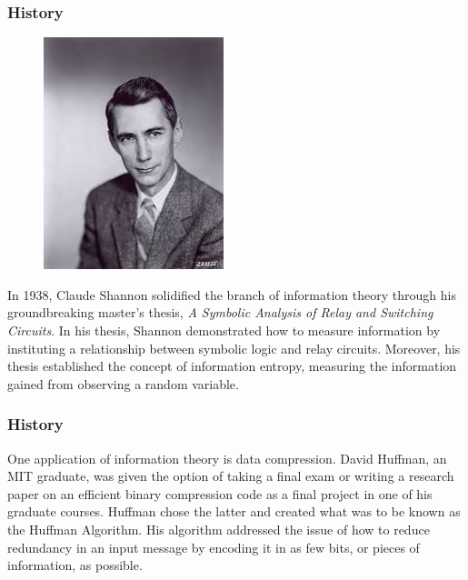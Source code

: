 \documentclass{beamer}
\theoremstyle{definition}
\begin{document}
\begin{frame}

\frametitle{History}

\begin{figure}

\centering
\includegraphics[scale=0.4]{Claude_Shannon}

\end{figure}

In 1938, Claude Shannon solidified the branch of information theory through his groundbreaking master's thesis, \textit{A Symbolic Analysis of Relay and Switching Circuits}.  In his thesis, Shannon demonstrated how to measure information by instituting a relationship between symbolic logic and relay circuits. Moreover, his thesis established the concept of information entropy, measuring the information gained from observing a random variable. 

\end{frame}

\begin{frame}

\frametitle{History}

One application of information theory is data compression. David Huffman, an MIT graduate, was given the option of taking a final exam or writing a research paper on an efficient binary compression code as a final project in one of his graduate courses. Huffman chose the latter and created what was to be known as the Huffman Algorithm. His algorithm addressed the issue of how to reduce redundancy in an input message by encoding it in as few bits, or pieces of information, as possible. 

\end{frame}
\end{document}
